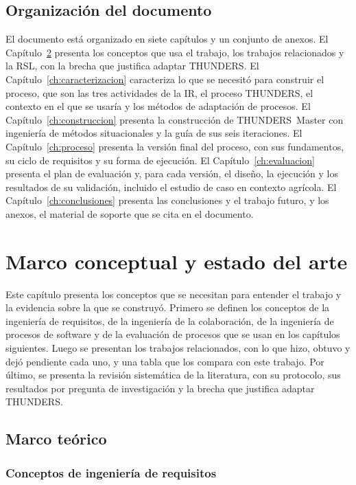 \documentclass[12pt,letterpaper,oneside]{report}
\begin{document}
\section{Organización del documento}
El documento está organizado en siete capítulos y un conjunto de anexos. El Capítulo~\ref{ch:marco} presenta los conceptos que usa el trabajo, los
trabajos relacionados y la RSL, con la brecha que justifica adaptar THUNDERS. El
Capítulo~\ref{ch:caracterizacion} caracteriza lo que se necesitó para construir
el proceso, que son las tres actividades de la IR, el proceso THUNDERS, el
contexto en el que se usaría y los métodos de adaptación de procesos. El Capítulo~\ref{ch:construccion} presenta la construcción de THUNDERS~Master
con ingeniería de métodos situacionales y la guía de sus seis iteraciones. El Capítulo~\ref{ch:proceso} presenta la versión final del proceso, con sus
fundamentos, su ciclo de requisitos y su forma de ejecución. El
Capítulo~\ref{ch:evaluacion} presenta el plan de evaluación y, para cada
versión, el diseño, la ejecución y los resultados de su validación, incluido el
estudio de caso en contexto agrícola. El Capítulo~\ref{ch:conclusiones} presenta las conclusiones y el trabajo futuro,
y los anexos, el material de soporte que se cita en el documento.

\chapter{Marco conceptual y estado del arte}
\label{ch:marco}

Este capítulo presenta los conceptos que se necesitan para entender el trabajo y
la evidencia sobre la que se construyó. Primero se definen los conceptos de la
ingeniería de requisitos, de la ingeniería de la colaboración, de la ingeniería
de procesos de software y de la evaluación de procesos que se usan en los
capítulos siguientes. Luego se presentan los trabajos relacionados, con lo que
hizo, obtuvo y dejó pendiente cada uno, y una tabla que los compara con este
trabajo. Por último, se presenta la revisión sistemática de la literatura, con
su protocolo, sus resultados por pregunta de investigación y la brecha que
justifica adaptar THUNDERS.

\section{Marco teórico}
\label{sec:marco_teorico}

\subsection{Conceptos de ingeniería de requisitos}
\end{document}
